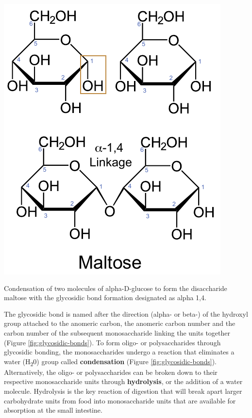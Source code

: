 \documentclass{tufte-handout}
\begin{document}
\begin{marginfigure}
\includegraphics{figures/glycosidic-bonds.pdf}
\caption{Condensation of two molecules of alpha-D-glucose to form the disaccharide maltose with the glycosidic bond formation designated as alpha 1,4.}
\label{fig:glycosidic-bonds}
\end{marginfigure}


 The glycosidic bond is named after the direction (alpha- or beta-) of the hydroxyl group attached to the anomeric carbon, the anomeric carbon number and the carbon number of the subsequent monosaccharide linking the units together (Figure \ref{fig:glycosidic-bonds}). To form oligo- or polysaccharides through glycosidic bonding, the monosaccharides undergo a reaction that eliminates a water (H\textsubscript{2}0) group called \textbf{condensation} (Figure \ref{fig:glycosidic-bonds}). Alternatively, the oligo- or polysaccharides can be broken down to their respective monosaccharide units through \textbf{hydrolysis}, or the addition of a water molecule. Hydrolysis is the key reaction of digestion that will break apart larger carbohydrate units from food into monosaccharide units that are available for absorption at the small intestine.
\end{document}
